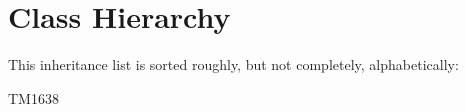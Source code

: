 \section{Class Hierarchy}
This inheritance list is sorted roughly, but not completely, alphabetically\+:\begin{DoxyCompactList}
\item T\+M1638\begin{DoxyCompactList}
\item {}
\end{DoxyCompactList}
\end{DoxyCompactList}

